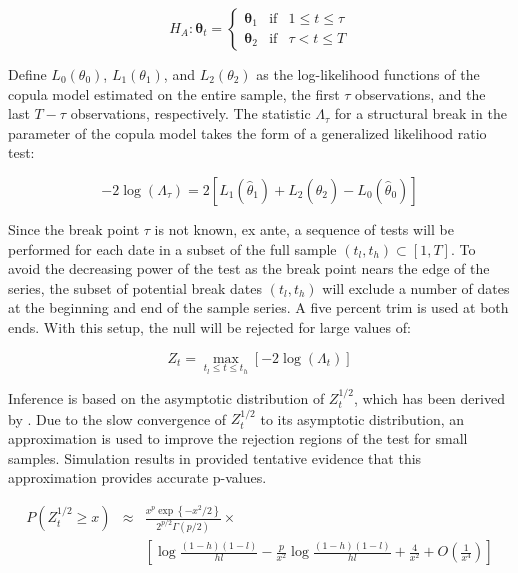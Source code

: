 \documentclass[12pt]{article}
\begin{document}
\begin{equation}
H_{A}:\boldsymbol{\theta}_{t} = \left\{
\begin{array}{ccc}
    \boldsymbol{\theta}_{1} & \text{if} & 1\leq t \leq \tau \\ 
    \boldsymbol{\theta}_{2} & \text{if} & \tau < t \leq T
\end{array}
\right. 
\end{equation}

Define $L_{0}\left(\theta_{0}\right)$, $L_{1}\left(\theta_{1}\right)$, and $L_{2}\left(\theta_{2}\right)$ as the log-likelihood functions of the copula model estimated on the entire sample, the first $\tau$ observations, and the last $T-\tau$ observations, respectively. The statistic $\Lambda_{\tau}$ for a structural break in the parameter of the copula model takes the form of a generalized likelihood ratio test:

\begin{equation}
	-2\log \left(\Lambda_{\tau}\right) = 2\left[L_{1}\left(\hat{\theta}_{1}\right) + L_{2}\left(\hat{\theta}_{2}\right) - L_{0}\left(\hat{\theta}_{0}\right)\right]
\end{equation}

Since the break point $\tau$ is not known, ex ante, a sequence of tests will be performed for each date in a subset of the full sample $\left(t_{l},t_{h}\right) \subset \left[1, T\right]$. To avoid the decreasing power of the test as the break point nears the edge of the series, the subset of potential break dates $\left( t_{l},t_{h}\right)$ will exclude a number of dates at the beginning and end of the sample series. A five percent trim is used at both ends. With this setup, the null will be rejected for large values of:

\begin{equation}
	Z_{t}=\max_{t_{l}\leq t\leq t_{h}}\left[ -2\log \left( \Lambda _{t}\right)\right]
\end{equation}

Inference is based on the asymptotic distribution of $Z_{t}^{1/2}$, which has been derived by \cite{Csorgo_and_Horvath_1997}. Due to the slow convergence of $Z_{t}^{1/2}$ to its asymptotic distribution, an approximation is used to improve the rejection regions of the test for small samples. Simulation results in \cite{Dias_and_Embrechts_2004} provided tentative evidence that this approximation provides accurate p-values.

\begin{eqnarray}
P\left(Z_{t}^{1/2} \geq x\right) &\approx& \frac{x^{p} \exp\left\{-x^{2}/2\right\}}{2^{p/2}\Gamma \left(p/2\right)} \times  \\
                                 && \left[\log \frac{\left(1-h\right) \left(1-l\right)}{hl} - \frac{p}{x^{2}}\log \frac{\left(1-h\right)\left(1-l\right)}{hl} + \frac{4}{x^{2}} + O \left(\frac{1}{x^{4}}\right)\right]
\end{eqnarray}
\end{document}
